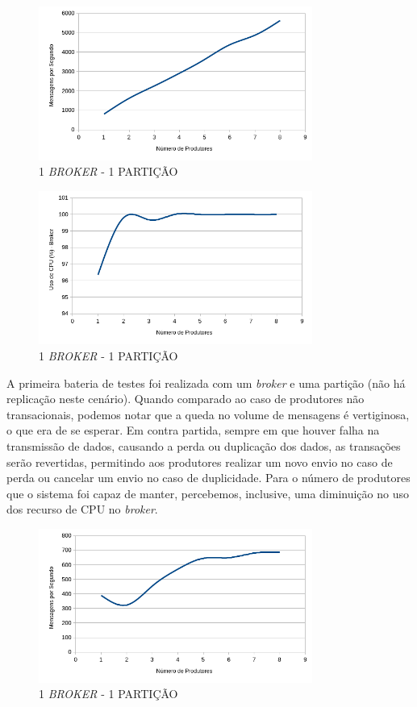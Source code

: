 \documentclass[12pt]{article}
\begin{document}
\begin{figure}[ht]
    \centering
    \includegraphics[width=0.8\textwidth]{images/graficos/g0a.png}
    \caption{1 \textit{BROKER} - 1 PARTIÇÃO}
    \label{fig:g0a}
\end{figure}

\begin{figure}[ht]
    \centering
    \includegraphics[width=0.8\textwidth]{images/graficos/g0b.png}
    \caption{1 \textit{BROKER} - 1 PARTIÇÃO}
    \label{fig:g0b}
\end{figure}
\clearpage

A primeira bateria de testes foi realizada com um \textit{broker} e uma partição (não há replicação neste cenário). Quando comparado ao caso de produtores não transacionais, podemos notar que a queda no volume de mensagens é vertiginosa, o que era de se esperar. Em contra partida, sempre em que houver falha na transmissão de dados, causando a perda ou duplicação dos dados, as transações serão revertidas, permitindo aos produtores realizar um novo envio no caso de perda ou cancelar um envio no caso de duplicidade. Para o número de produtores que o sistema foi capaz de manter, percebemos, inclusive, uma diminuição no uso dos recurso de CPU no \textit{broker}.

\begin{figure}[ht]
    \centering
    \includegraphics[width=0.8\textwidth]{images/graficos/g1a.png}
    \caption{1 \textit{BROKER} - 1 PARTIÇÃO}
    \label{fig:g1a}
\end{figure}
\end{document}
